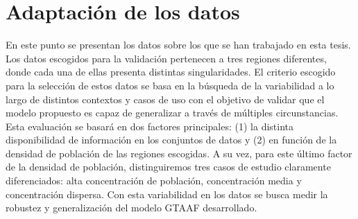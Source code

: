 	








\section{Adaptación de los datos}
\label{DATA_PRESENTATION_RESULTS}


En este punto se presentan los datos sobre los que se han trabajado en esta tesis. Los datos escogidos para la validación pertenecen a tres regiones diferentes, donde cada una de ellas presenta distintas singularidades. El criterio escogido para la selección de estos datos se basa en la búsqueda de la variabilidad a lo largo de distintos contextos y casos de uso con el objetivo de validar que el modelo propuesto es capaz de generalizar a través de múltiples circunstancias. Esta evaluación se basará en dos factores principales: (1) la distinta disponibilidad de información en los conjuntos de datos y (2) en función de la densidad de población de las regiones escogidas. A su vez, para este último factor de la densidad de población, distinguiremos tres casos de estudio claramente diferenciados: alta concentración de población, concentración media y concentración dispersa. Con esta variabilidad en los datos se busca medir la robustez y generalización del modelo GTAAF desarrollado.



